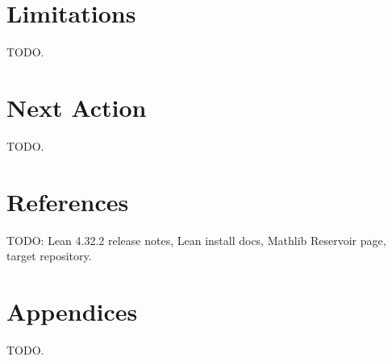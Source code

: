 \documentclass[11pt]{article}
\begin{document}
\section{Limitations}
TODO.

\section{Next Action}
TODO.

\section{References}
TODO: Lean 4.32.2 release notes, Lean install docs, Mathlib Reservoir page,
target repository.

\appendix
\section{Appendices}
TODO.
\end{document}
